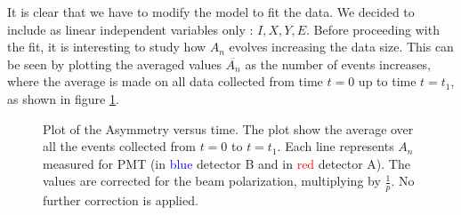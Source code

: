 
It is clear that we have to modify the model to fit the data. We decided to include as linear independent variables only : $I,X,Y,E$. Before proceeding with the fit, it is interesting to study how $A_{n}$ evolves increasing the data size. This can be seen by plotting the averaged values $\overline{A_{n}}$ as the number of events increases, where the average is made on all data collected from time $t = 0$ up to time $t = t_{1}$, as shown in figure \ref{fig:AsymOverTime}. 

\begin{figure}[!hbtp]
\centering
{}
\caption{Plot of the Asymmetry versus time. The plot show the average over all the events collected from $t = 0$ to $t = t_{1}$. Each line represents $A_{n}$ measured for  PMT (in \textcolor{blue}{blue} detector B and in \textcolor{red}{red} detector A). The values are corrected for the beam polarization, multiplying by $\frac{1}{p}$. No further correction is applied.}
\label{fig:AsymOverTime}
\end{figure}

